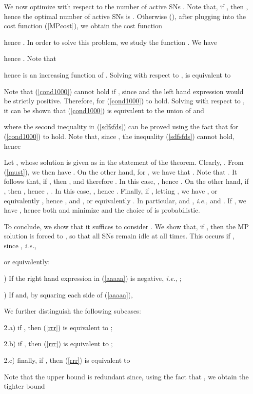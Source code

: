 \documentclass[10pt,twocolumn,twoside]{IEEEtran}
\theoremstyle{plain}
\begin{document}
We now optimize with respect to the number of active SNs .
Note that, if , then , hence
 the optimal number of active SNs is .
 Otherwise (), after plugging  into the cost function (\ref{MPcost}), we obtain the cost function

hence .
In order to solve this problem, we study the function .
We have

hence .
Note that 

hence  is an increasing function of .
Solving with respect to ,  is equivalent to

 Note that (\ref{cond1000}) cannot hold if , since  and the left hand expression would be strictly positive. Therefore,  for (\ref{cond1000}) to hold. Solving with respect to , it can be shown that
 (\ref{cond1000}) is equivalent to the union of  and
  
 where the second inequality in (\ref{sdfsfds}) can be proved using the fact that  for (\ref{cond1000}) to hold.
 Note that, since , the inequality (\ref{sdfsfds}) cannot hold, hence
 
Let , whose solution is given as in the statement of the theorem.
 Clearly, .
From (\ref{must}), we then have .
On the other hand, for , we have that 
.
Note that .
It follows that, if , then 
, and therefore .
In this case, , hence .
On the other hand, if , then ,
hence , . In this case,
, hence .
Finally, if
 , 
 letting ,
we have , or equivalently ,
hence , and
, or equivalently .
In particular,  and , \emph{i.e.},
 and .
If , we have , hence both  and  minimize  and
the choice of  is probabilistic.

To conclude, we show that it suffices to consider .
We show that, if , then the MP solution is forced to , so that all SNs remain idle at all times.
This occurs if , since , \emph{i.e.},

or equivalently:

) If the right hand expression in (\ref{aaaaa}) is negative, \emph{i.e.},
;

) If  and, by squaring each side of (\ref{aaaaa}),

We further distinguish the following subcases:

\noindent 2.a) if , then (\ref{rrr}) is equivalent to ;

\noindent 2.b) if , then (\ref{rrr}) is equivalent to ;

\noindent 2.c) finally, if , then (\ref{rrr}) is equivalent to

Note that the upper bound is redundant since, 
using the fact that 
, we obtain the tighter bound
\end{document}
